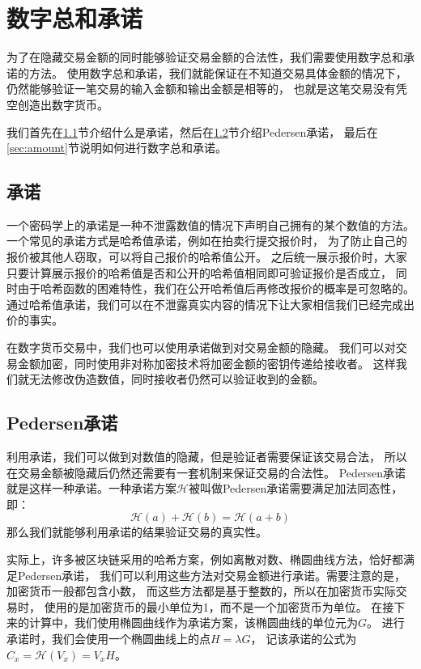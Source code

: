 \chapter{数字总和承诺}\label{chap:pedersen}

为了在隐藏交易金额的同时能够验证交易金额的合法性，我们需要使用数字总和承诺的方法。
使用数字总和承诺，我们就能保证在不知道交易具体金额的情况下，
仍然能够验证一笔交易的输入金额和输出金额是相等的，
也就是这笔交易没有凭空创造出数字货币。

我们首先在\ref{sec:commit}节介绍什么是承诺，然后在\ref{sec:pedersen}节介绍Pedersen承诺，
最后在\ref{sec:amount}节说明如何进行数字总和承诺。

\section{承诺}\label{sec:commit}

一个密码学上的承诺是一种不泄露数值的情况下声明自己拥有的某个数值的方法。
一个常见的承诺方式是哈希值承诺，例如在拍卖行提交报价时，
为了防止自己的报价被其他人窃取，可以将自己报价的哈希值公开。
之后统一展示报价时，大家只要计算展示报价的哈希值是否和公开的哈希值相同即可验证报价是否成立，
同时由于哈希函数的困难特性，我们在公开哈希值后再修改报价的概率是可忽略的。
通过哈希值承诺，我们可以在不泄露真实内容的情况下让大家相信我们已经完成出价的事实。

在数字货币交易中，我们也可以使用承诺做到对交易金额的隐藏。
我们可以对交易金额加密，同时使用非对称加密技术将加密金额的密钥传递给接收者。
这样我们就无法修改伪造数值，同时接收者仍然可以验证收到的金额。

\section{Pedersen承诺}\label{sec:pedersen}

利用承诺，我们可以做到对数值的隐藏，但是验证者需要保证该交易合法，
所以在交易金额被隐藏后仍然还需要有一套机制来保证交易的合法性。
Pedersen承诺\cite{noether2016ring}就是这样一种承诺。一种承诺方案$\mathcal{H}$被叫做Pedersen承诺需要满足加法同态性，即：
%
$$\mathcal{H}(a)+\mathcal{H}(b)=\mathcal{H}(a+b)$$
%
那么我们就能够利用承诺的结果验证交易的真实性。

实际上，许多被区块链采用的哈希方案，例如离散对数、椭圆曲线方法，恰好都满足Pedersen承诺，
我们可以利用这些方法对交易金额进行承诺。需要注意的是，加密货币一般都包含小数，
而这些方法都是基于整数的，所以在加密货币实际交易时，
使用的是加密货币的最小单位为1，而不是一个加密货币为单位。
在接下来的计算中，我们使用椭圆曲线作为承诺方案，该椭圆曲线的单位元为$G$。
进行承诺时，我们会使用一个椭圆曲线上的点$H=\lambda G$，
记该承诺的公式为$C_x=\mathcal{H}(V_x)=V_xH$。

